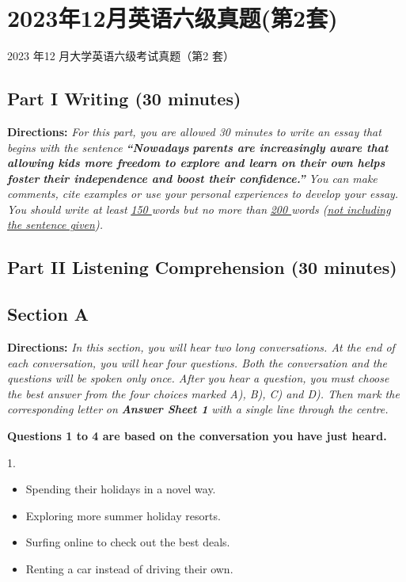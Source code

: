 \documentclass[UTF8,11pt]{ctexart}
\begin{document}
\section*{2023年12月英语六级真题(第2套)}
2023 年12 月大学英语六级考试真题（第2 套）


\subsection*{\textbf{Part I Writing} \textbf{(30 minutes)}}


\textbf{Directions:}\textit{ For this part, you are allowed 30 minutes to write an essay that begins with the sentence }\textbf{\textit{“Nowadays}} \textbf{\textit{parents are increasingly aware that allowing kids more freedom to explore and learn on their own helps foster}} \textbf{\textit{their independence and boost their confidence.”}}\textit{ You can make comments, cite examples or use your personal} \textit{experiences to develop your essay. You should write at least }\textit{\uline{150 }}\textit{words but no more than }\textit{\uline{200 }}\textit{words (}\textit{\uline{not including}} \textit{\uline{the sentence given}}\textit{).}


\subsection*{\textbf{Part II} \textbf{Listening Comprehension} \textbf{(30 minutes)}}


\subsection*{\textbf{Section A}}


\textbf{Directions:} \textit{In this section, you will hear two long conversations. At the end of each conversation, you will hear} \textit{four questions. Both the conversation and the questions will be spoken only once. After you hear a question, you} \textit{must choose the best answer from the four choices marked A), B), C) and D). Then mark the corresponding letter} \textit{on }\textbf{\textit{Answer Sheet 1}}\textit{ with a single line through the centre.}


\textbf{Questions 1 to 4 are based on the conversation you have just heard.}


1.


\begin{itemize}[leftmargin=2em,itemsep=.2em,topsep=.4em]\item[A.] Spending their holidays in a novel way.
\item[B.] Exploring more summer holiday resorts.
\item[C.] Surfing online to check out the best deals.
\item[D.] Renting a car instead of driving their own.
\end{itemize}
\end{document}

